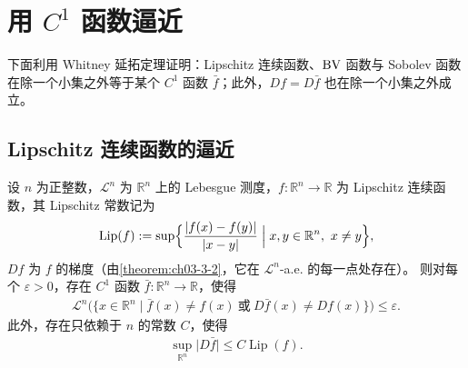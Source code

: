 \documentclass[../../main.tex]{subfiles}%
\begin{document}
\section{用 $C^1$ 函数逼近}\label{section:ch06-06}

下面利用 Whitney 延拓定理证明：Lipschitz 连续函数、$\mathrm{BV}$ 函数与 Sobolev 函数在除一个小集之外等于某个 $C^1$ 函数 $\bar f$；此外，$Df=D\bar f$ 也在除一个小集之外成立。

\subsection{Lipschitz 连续函数的逼近}\label{subsection:ch06-06-1}

\begin{theorem}\label{theorem:ch06-6-11}
设 $n$ 为正整数，$\mathcal{L}^n$ 为 $\mathbb{R}^n$ 上的 Lebesgue 测度，$f:\mathbb{R}^n\to\mathbb{R}$ 为 Lipschitz 连续函数，其 Lipschitz 常数记为
\begin{align*}
\operatorname{Lip}(f):=\sup\Bigl\{\frac{\lvert f(x)-f(y)\rvert}{\lvert x-y\rvert}\Bigm|x,y\in\mathbb{R}^n,\ x\ne y\Bigr\},
\end{align*}
$Df$ 为 $f$ 的梯度（由\cref{theorem:ch03-3-2}，它在 $\mathcal{L}^n$-a.e. 的每一点处存在）。%
则对每个 $\varepsilon>0$，存在 $C^1$ 函数 $\bar f:\mathbb{R}^n\to\mathbb{R}$，使得
\begin{align*}
\mathcal{L}^n\bigl(\{x\in\mathbb{R}^n\mid\bar f(x)\ne f(x)\ \text{或}\ D\bar f(x)\ne Df(x)\}\bigr)\le\varepsilon .
\end{align*}
此外，存在只依赖于 $n$ 的常数 $C$，使得
\begin{align*}
\sup_{\mathbb{R}^n}\lvert D\bar f\rvert\le C\operatorname{Lip}(f).
\end{align*}
\end{theorem}
\end{document}
